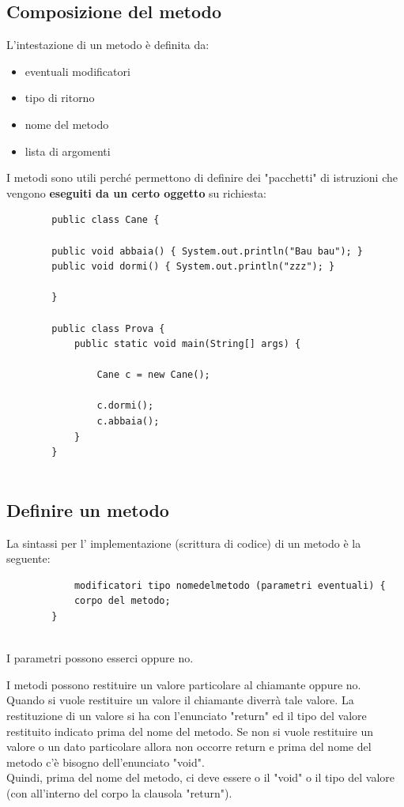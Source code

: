 \documentclass[a4paper,12 pt]{article}
\begin{document}
	\subsection{Composizione del metodo}
		L'intestazione di un metodo è definita da:
		\begin{itemize}
			\item eventuali modificatori
			\item tipo di ritorno
			\item nome del metodo
			\item lista di argomenti
		\end{itemize}
		I metodi sono utili perché permettono di definire dei "pacchetti" di istruzioni che vengono \textbf{eseguiti da un certo oggetto} su richiesta:
		
		\begin{lstlisting}
		public class Cane {
			
		public void abbaia() { System.out.println("Bau bau"); }
		public void dormi() { System.out.println("zzz"); }
			
		}
		
		public class Prova {
			public static void main(String[] args) {
			
			 	Cane c = new Cane();
			 	
				c.dormi();
				c.abbaia();
			}
		}
		
		\end{lstlisting}
	\subsection{Definire un metodo}
		La sintassi per l' implementazione (scrittura di codice) di un metodo è la seguente:
		\begin{lstlisting}
			modificatori tipo nomedelmetodo (parametri eventuali) {
			corpo del metodo;
		}
	
		\end{lstlisting}
		
		I parametri possono esserci oppure no.
		
		\noindent I metodi possono restituire un valore particolare al chiamante oppure no.\\ Quando si vuole restituire un valore il chiamante diverrà tale valore. La restituzione di un valore si ha con l'enunciato "return" ed il tipo del valore restituito indicato prima del nome del metodo. Se non si vuole restituire un valore o un dato particolare allora non occorre return e prima del nome del metodo c'è bisogno dell'enunciato "void". \\ Quindi, prima del nome del metodo, ci deve essere o il "void" o il tipo del valore (con all'interno del corpo la clausola "return").
		
\end{document}
